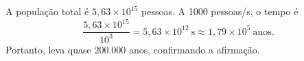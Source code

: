 A população total é $5{,}63\times10^{15}$ pessoas. A 1000 pessoas/s, o tempo é
\[
\frac{5{,}63\times10^{15}}{10^{3}}=5{,}63\times10^{12}\ \mathrm{s} \approx1{,}79\times10^{5}\ \mathrm{anos}.
\]
Portanto, leva quase 200.000 anos, confirmando a afirmação. 